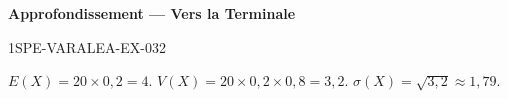 \begin{center}\textbf{Approfondissement — Vers la Terminale}\end{center}
\begin{corrige}{1SPE-VARALEA-EX-032}

$E(X) = 20 \times 0{,}2 = 4$. \quad $V(X) = 20 \times 0{,}2 \times 0{,}8 = 3{,}2$. \quad $\sigma(X) = \sqrt{3{,}2} \approx 1{,}79$.

\end{corrige}
